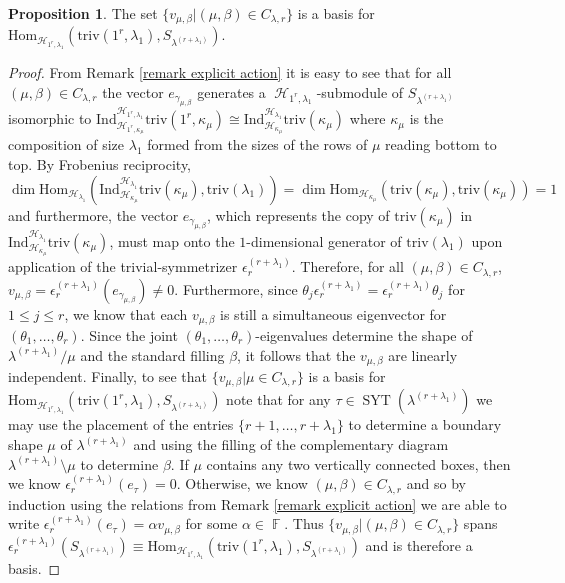 \documentclass[12pt,reqno]{amsart}
\theoremstyle{definition}
\newtheorem{prop}[thm]{Proposition}
\DeclareMathOperator{\bF}{\mathbb{F}}
\DeclareMathOperator{\cH}{\mathcal{H}}
\DeclareMathOperator{\SYT}{\mathrm{SYT}}
\begin{document}
\begin{prop}\label{prop partial inv basis}
    The set $\{v_{\mu,\beta}| (\mu,\beta) \in C_{\lambda,r}\}$ is a basis for $\mathrm{Hom}_{\cH_{1^r,\lambda_1}}(\mathrm{triv}(1^r,\lambda_1),  S_{\lambda^{(r+\lambda_1)}})$.
\end{prop}
\begin{proof}
    From Remark \ref{remark explicit action} it is easy to see that for all $(\mu,\beta) \in C_{\lambda,r}$ the vector $e_{\gamma_{\mu,\beta}}$ generates a $\cH_{1^r,\lambda_1}$-submodule of $S_{\lambda^{(r+\lambda_1)}}$ isomorphic to $\mathrm{Ind}_{\cH_{1^r,\kappa_{\mu}}}^{\cH_{1^r,\lambda_1}} \mathrm{triv}(1^r,\kappa_{\mu}) \cong \mathrm{Ind}_{\cH_{\kappa_{\mu}}}^{\cH_{\lambda_1}} \mathrm{triv}(\kappa_{\mu})$ where $\kappa_{\mu}$ is the composition of size $\lambda_1$ formed from the sizes of the rows of $\mu$ reading bottom to top. By Frobenius reciprocity, 
    $$\dim \mathrm{Hom}_{\cH_{\lambda_1}}\left( \mathrm{Ind}_{\cH_{\kappa_{\mu}}}^{\cH_{\lambda_1}} \mathrm{triv}(\kappa_{\mu}) , \mathrm{triv}(\lambda_1) \right) = \dim \mathrm{Hom}_{\cH_{\kappa_{\mu}}}\left( \mathrm{triv}(\kappa_{\mu}) , \mathrm{triv}(\kappa_{\mu}) \right) =1$$ and furthermore, the vector $e_{\gamma_{\mu,\beta}}$, which represents the copy of $\mathrm{triv}(\kappa_{\mu})$ in $\mathrm{Ind}_{\cH_{\kappa_{\mu}}}^{\cH_{\lambda_1}} \mathrm{triv}(\kappa_{\mu})$, must map onto the $1$-dimensional generator of $\mathrm{triv}(\lambda_1)$ upon application of the trivial-symmetrizer $\epsilon_{r}^{(r+\lambda_1)}$. Therefore, for all $(\mu,\beta) \in C_{\lambda,r}$, $v_{\mu,\beta} = \epsilon_{r}^{(r+\lambda_1)}(e_{\gamma_{\mu,\beta}}) \neq 0.$ Furthermore, since $\theta_j \epsilon_{r}^{(r+\lambda_1)} = \epsilon_{r}^{(r+\lambda_1)}\theta_{j}$ for $1\leq j \leq r$, we know that each $v_{\mu,\beta}$ is still a simultaneous eigenvector for $(\theta_1,\dots,\theta_{r}).$ Since the joint $(\theta_1,\dots,\theta_{r})$-eigenvalues determine the shape of $\lambda^{(r+\lambda_1)}/\mu$ and the standard filling $\beta$, it follows that the $v_{\mu,\beta}$ are linearly independent. Finally, to see that $\{v_{\mu,\beta}| \mu \in C_{\lambda,r}\}$ is a basis for $\mathrm{Hom}_{\cH_{1^r,\lambda_1}}(\mathrm{triv}(1^r,\lambda_1),  S_{\lambda^{(r+\lambda_1)}})$ note that for any $\tau \in \SYT(\lambda^{(r+\lambda_1)})$ we may use the placement of the entries $\{r+1,\dots,r+\lambda_1\}$ to determine a boundary shape $\mu$ of $\lambda^{(r+\lambda_1)}$ and using the filling of the complementary diagram $\lambda^{(r+\lambda_1)}\setminus \mu$ to determine $\beta.$ If $\mu$ contains any two vertically connected boxes, then we know $\epsilon_{r}^{(r+\lambda_1)}(e_{\tau}) = 0.$ Otherwise, we know $(\mu,\beta) \in C_{\lambda,r}$ and so by induction using the relations from Remark \ref{remark explicit action} we are able to write $\epsilon_{r}^{(r+\lambda_1)}(e_{\tau}) = \alpha v_{\mu,\beta}$ for some $\alpha \in \bF$. Thus $\{ v_{\mu,\beta}| (\mu,\beta) \in C_{\lambda,r}\}$ spans $\epsilon_{r}^{(r+\lambda_1)}\left( S_{\lambda^{(r+\lambda_1)}} \right) \equiv \mathrm{Hom}_{\cH_{1^r,\lambda_1}}(\mathrm{triv}(1^r,\lambda_1),  S_{\lambda^{(r+\lambda_1)}})$ and is therefore a basis. 
\end{proof}
\end{document}
